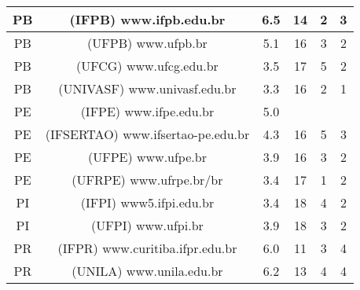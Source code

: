 \begin{center}
\begin{longtable}{|c|l|l|l|l|l|}
\hline
\multicolumn{1}{|c|}{PB} & \multicolumn{1}{c|}{(IFPB) www.ifpb.edu.br} & \multicolumn{1}{c|}{6.5} & \multicolumn{1}{c|}{14} & \multicolumn{1}{c|}{2} & \multicolumn{1}{c|}{3} \\ 
\hline
\multicolumn{1}{|c|}{PB} & \multicolumn{1}{c|}{(UFPB) www.ufpb.br} & \multicolumn{1}{c|}{5.1} & \multicolumn{1}{c|}{16} & \multicolumn{1}{c|}{3} & \multicolumn{1}{c|}{2} \\ 
\hline
\multicolumn{1}{|c|}{PB} & \multicolumn{1}{c|}{(UFCG) www.ufcg.edu.br} & \multicolumn{1}{c|}{3.5} & \multicolumn{1}{c|}{17} & \multicolumn{1}{c|}{5} & \multicolumn{1}{c|}{2} \\ 
\hline
\multicolumn{1}{|c|}{PB} & \multicolumn{1}{c|}{(UNIVASF) www.univasf.edu.br} & \multicolumn{1}{c|}{3.3} & \multicolumn{1}{c|}{16} & \multicolumn{1}{c|}{2} & \multicolumn{1}{c|}{1} \\ 
\hline
\multicolumn{1}{|c|}{PE} & \multicolumn{1}{c|}{(IFPE) www.ifpe.edu.br} & \multicolumn{1}{c|}{5.0} & \multicolumn{1}{c|}{} & \multicolumn{1}{c|}{} & \multicolumn{1}{c|}{} \\ 
\hline
\multicolumn{1}{|c|}{PE} & \multicolumn{1}{c|}{(IFSERTAO) www.ifsertao-pe.edu.br} & \multicolumn{1}{c|}{4.3} & \multicolumn{1}{c|}{16} & \multicolumn{1}{c|}{5} & \multicolumn{1}{c|}{3} \\ 
\hline
\multicolumn{1}{|c|}{PE} & \multicolumn{1}{c|}{(UFPE) www.ufpe.br} & \multicolumn{1}{c|}{3.9} & \multicolumn{1}{c|}{16} & \multicolumn{1}{c|}{3} & \multicolumn{1}{c|}{2} \\ 
\hline
\multicolumn{1}{|c|}{PE} & \multicolumn{1}{c|}{(UFRPE) www.ufrpe.br/br} & \multicolumn{1}{c|}{3.4} & \multicolumn{1}{c|}{17} & \multicolumn{1}{c|}{1} & \multicolumn{1}{c|}{2} \\ 
\hline
\multicolumn{1}{|c|}{PI} & \multicolumn{1}{c|}{(IFPI) www5.ifpi.edu.br} & \multicolumn{1}{c|}{3.4} & \multicolumn{1}{c|}{18} & \multicolumn{1}{c|}{4} & \multicolumn{1}{c|}{2} \\ 
\hline
\multicolumn{1}{|c|}{PI} & \multicolumn{1}{c|}{(UFPI) www.ufpi.br} & \multicolumn{1}{c|}{3.9} & \multicolumn{1}{c|}{18} & \multicolumn{1}{c|}{3} & \multicolumn{1}{c|}{2} \\ 
\hline
\multicolumn{1}{|c|}{PR} & \multicolumn{1}{c|}{(IFPR) www.curitiba.ifpr.edu.br} & \multicolumn{1}{c|}{6.0} & \multicolumn{1}{c|}{11} & \multicolumn{1}{c|}{3} & \multicolumn{1}{c|}{4} \\ 
\hline
\multicolumn{1}{|c|}{PR} & \multicolumn{1}{c|}{(UNILA) www.unila.edu.br} & \multicolumn{1}{c|}{6.2} & \multicolumn{1}{c|}{13} & \multicolumn{1}{c|}{4} & \multicolumn{1}{c|}{4} \\ 

\end{longtable}
\end{center}
